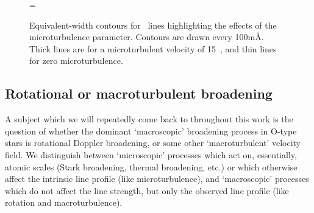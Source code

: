 \begin{figure} %
\epsfxsize=\figwidth
\setlength{\cen}{(\textwidth / 2) - (\epsfxsize / 2)}
\hspace{\cen}
\caption[Microturbulence dependence for \hei]
{\fcfont Equivalent-width contours for \hei\ lines highlighting the
effects of the microturbulence parameter. Contours are drawn every 100m\AA.
Thick lines are for a microturbulent velocity of 15~\kms, and thin
lines for zero microturbulence.
}
\label{fig:mturb:he1}
\end{figure}   %


\subsection{Rotational or macroturbulent broadening}

A subject which we will repeatedly come back to throughout this work
is the question of whether the dominant `macroscopic' broadening process
in O-type stars is rotational Doppler broadening, or some other
`macroturbulent' velocity field. We distinguish between `microscopic'
processes which act on, essentially, atomic scales (Stark broadening,
thermal broadening, etc.) or which otherwise affect the intrinsic line
profile (like microturbulence), and `macroscopic' processes which do
not affect the line strength, but only the observed line profile (like
rotation and macroturbulence).

